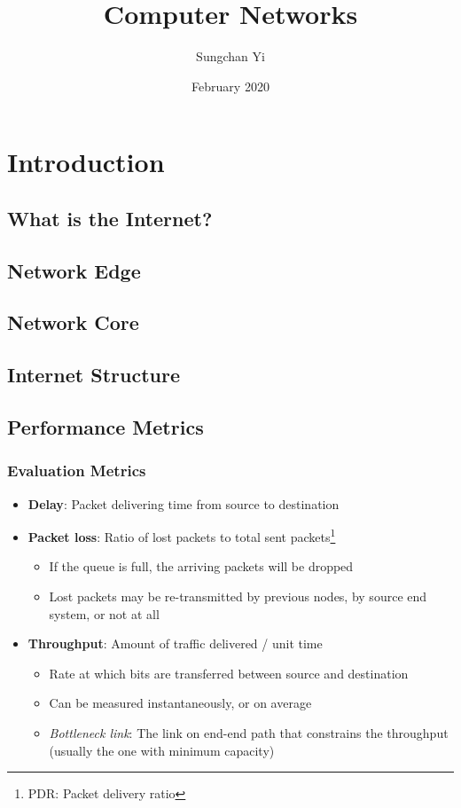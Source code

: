 \documentclass{article}
\title{\textbf{Computer Networks}}
\author{Sungchan Yi}
\date{February 2020}
\begin{document}
\maketitle

\section{Introduction}
\subsection{What is the Internet?}

\subsection{Network Edge}

\subsection{Network Core}

\subsection{Internet Structure}

\subsection{Performance Metrics}
\subsubsection{Evaluation Metrics}
\begin{itemize}
    \item \textbf{Delay}: Packet delivering time from source to destination
    \item \textbf{Packet loss}: Ratio of lost packets to total sent packets\footnote{PDR: Packet delivery ratio}
    \begin{itemize}
        \item If the queue is full, the arriving packets will be dropped
        \item Lost packets may be re-transmitted by previous nodes, by source end system, or not at all
    \end{itemize}
    \item \textbf{Throughput}: Amount of traffic delivered / unit time
    \begin{itemize}
        \item Rate at which bits are transferred between source and destination
        \item Can be measured instantaneously, or on average
        \item \textit{Bottleneck link}: The link on end-end path that constrains the throughput (usually the one with minimum capacity)
    \end{itemize}
\end{itemize}
\end{document}
